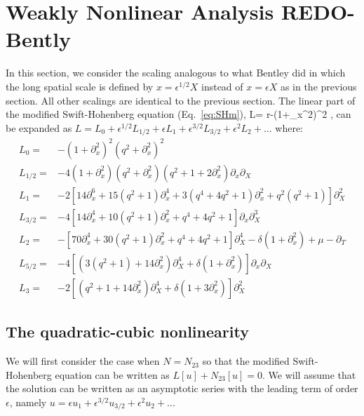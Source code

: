 \documentclass[../main/WavelengthCompetition.tex]{subfiles}
\begin{document}
\section{Weakly Nonlinear Analysis REDO-Bently}
In this section, we consider the scaling analogous to what Bentley did in which the long spatial scale is defined by $x=\epsilon^{1/2}X$ instead of $x=\epsilon X$ as in the previous section.  All other scalings are identical to the previous section.
The linear part of the modified Swift-Hohenberg equation (Eq.~\ref{eq:SHm}), 
\beqn
L= r-\left(1+\partial_{x}^2\right)^2 ,
\eeqn
can be expanded as $L=L_0+\epsilon^{1/2} L_{1/2}+\epsilon L_1+\epsilon^{3/2} L_{3/2}+\epsilon^2 L_2+...$ where:
\begin{subequations}
\begin{align}
L_0 =& -\left(1+\partial_x^2\right)^2 \left(q^2+\partial_x^2\right)^2 \\
L_{1/2} =& -4\left(1+\partial_x^2\right)  \left(q^2+\partial_x^2\right) \left(q^2+1+2 \partial_x^2\right)\partial_x\partial_X \\
L_1 =&- 2 \left[14 \partial_x^6+15  \left(q^2+1\right)\partial_x^4+3 \left(q^4+4 q^2+1\right) \partial_x^2+q^2\left(q^2+1\right)\right] \partial_X^2\\  
L_{3/2} =& -4   \left[ 14 \partial_x^4+10  \left(q^2+1\right)\partial_x^2+q^4+ 4 q^2+1\right]\partial_x \partial_X^3 \\
L_2 =& -\left[ 70 \partial_x^4+30\left(q^2+1\right) \partial_x^2 +q^4 +4 q^2+1\right]\partial_X^4-\delta\left(1 +\partial_x^2\right)+\mu-\partial_T  \\
L_{5/2} =& -4 \left[ \left(3(q^2+1)+14 \partial_x^2\right)\partial_X^4+\delta(1 +\partial_x^2) \right] \partial_x \partial_X  \\
L_{3} =& -2 \left[ \left(q^2+1+14 \partial_x^2\right)\partial_X^4 +\delta(1 +3 \partial_x^2) \right] \partial_X^2 
\end{align}
\end{subequations}

\subsection{The quadratic-cubic nonlinearity}
We will first consider the case when $N=N_{23}$ so that the modified Swift-Hohenberg equation can be written as $L[u]+N_{23}[u]=0$.  We will assume that the solution can be written as an asymptotic series with the leading term of order $\epsilon$, namely $u=\epsilon u_1 + \epsilon^{3/2} u_{3/2} +\epsilon^2 u_2+...$ 
\end{document}
